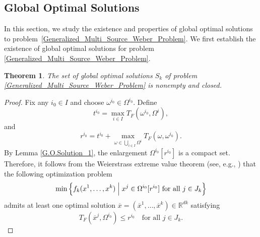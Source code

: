 \documentclass[sn-mathphys-num]{sn-jnl}%
\newtheorem{theorem}{Theorem}[section]
\theoremstyle{definition}
\begin{document}
\subsection{Global Optimal Solutions}
In this section, we study the existence and properties of global optimal solutions to problem~\eqref{Generalized_Multi_Source_Weber_Problem}.
We first establish the existence of global optimal solutions for problem \eqref{Generalized_Multi_Source_Weber_Problem}.


\begin{theorem}
	\label{G.O.Solution_2}
	The set of global optimal solutions $S_k$ of problem \eqref{Generalized_Multi_Source_Weber_Problem} is nonempty and closed.
\end{theorem}
\begin{proof}
	Fix any \( i_0 \in I \) and choose \(\omega^{i_0} \in \Omega^{i_0} \). Define
	\begin{equation}\label{key2}
		t^{i_0} = \max_{i \in I} T_F(\omega^{i_0},\Omega^i),    
	\end{equation}
	and
	\begin{equation}\label{key3}
		r^{i_0} = t^{i_0}  + \max_{\omega \in \bigcup_{i \in I} \Omega^i} T_F(\omega,\omega^{i_0}) .
	\end{equation}
	By Lemma \ref{G.O.Solution_1}, the enlargement \( \Omega^{i_0}[r^{i_0}] \) is a compact set. Therefore, it follows from the Weierstrass extreme value theorem (see, e.g., \cite[Theorem 7.9(i)]{mordukhovich2023easy}) that the following optimization problem
	\[
	\min \left\{f_k(x^1,\dots,x^k)\;\Big{|}\; x^j \in \Omega^{i_0}[r^{i_0}] \text{ for all } j \in J_k \right\}
	\]
	admits at least one optimal solution \( \overline{x} = (\overline{x}^1,\dots,\overline{x}^k) \in \mathbb{R}^{dk} \) satisfying
	\[
	T_F(\overline{x}^j,\Omega^{i_0}) \leq r^{i_0} \quad \text{for all } j \in J_k.
	\]
	

\end{proof}
\end{document}
